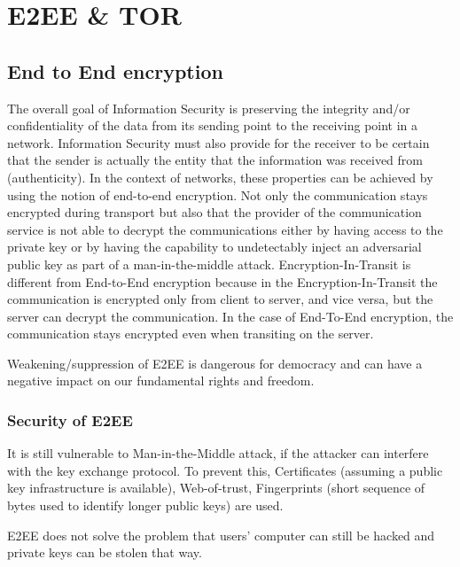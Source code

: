 \chapter{E2EE \& TOR}

\section{End to End encryption}

The overall goal of Information Security is preserving the integrity and/or confidentiality of the data from its sending point to the receiving point in a network. Information Security must also provide for the receiver to be certain that the sender is actually the entity that the information was received from (authenticity). In the context of networks, these properties can be achieved by using the notion of end-to-end encryption.
Not only the communication stays encrypted during transport but also that the provider of the communication service is not able to decrypt the communications either by having access to the private key or by having the capability to undetectably inject an adversarial public key as part of a man-in-the-middle attack.
Encryption-In-Transit is different from End-to-End encryption because in the Encryption-In-Transit the communication is encrypted only from client to server, and vice versa, but the server can decrypt the communication. In the case of End-To-End encryption, the communication stays encrypted even when transiting on the server.

Weakening/suppression of E2EE is dangerous for democracy and can have a negative impact on our fundamental rights and freedom.

\subsection{Security of E2EE}

It is still vulnerable to Man-in-the-Middle attack, if the attacker can interfere with the key exchange protocol. To prevent this, Certificates (assuming a public key infrastructure is available), Web-of-trust, Fingerprints (short sequence of bytes used to identify longer public keys) are used.

E2EE does not solve the problem that users' computer can still be hacked and private keys can be stolen that way.


